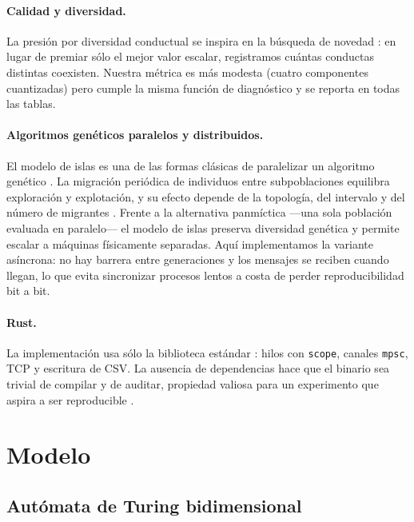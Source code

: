 \documentclass[11pt,a4paper]{article}
\begin{document}
\paragraph{Calidad y diversidad.}
La presi\'on por diversidad conductual se inspira en la b\'usqueda de novedad
\citep{lehman2011}: en lugar de premiar s\'olo el mejor valor escalar,
registramos cu\'antas conductas distintas coexisten.  Nuestra m\'etrica es m\'as
modesta (cuatro componentes cuantizadas) pero cumple la misma funci\'on de
diagn\'ostico y se reporta en todas las tablas.

\paragraph{Algoritmos gen\'eticos paralelos y distribuidos.}
El modelo de islas es una de las formas cl\'asicas de paralelizar un algoritmo
gen\'etico \citep{tanese1989,cantupaz1998,alba2002}.  La migraci\'on peri\'odica
de individuos entre subpoblaciones equilibra exploraci\'on y explotaci\'on, y su
efecto depende de la topolog\'ia, del intervalo y del n\'umero de migrantes
\citep{whitley1998island}.  Frente a la alternativa panm\'ictica ---una sola
poblaci\'on evaluada en paralelo--- el modelo de islas preserva diversidad
gen\'etica y permite escalar a m\'aquinas f\'isicamente separadas.  Aqu\'i
implementamos la variante as\'incrona: no hay barrera entre generaciones y los
mensajes se reciben cuando llegan, lo que evita sincronizar procesos lentos a
costa de perder reproducibilidad bit a bit.

\paragraph{Rust.}
La implementaci\'on usa s\'olo la biblioteca est\'andar \citep{klabnik2023}:
hilos con \texttt{scope}, canales \texttt{mpsc}, TCP y escritura de CSV.  La
ausencia de dependencias hace que el binario sea trivial de compilar y de
auditar, propiedad valiosa para un experimento que aspira a ser reproducible
\citep{peng2011}.

\section{Modelo}\label{sec:model}

\subsection{Aut\'omata de Turing bidimensional}
\end{document}
